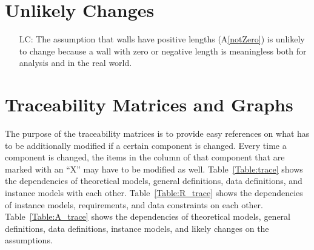 \documentclass[12pt]{article}
\newcommand{\aref}[1]{A\ref{#1}}
\newcounter{lcnum} %
\begin{document}
\section{Unlikely Changes}    

\noindent \begin{itemize}

\item[LC\refstepcounter{lcnum}\thelcnum\label{WallsHaveLength}:]  The assumption 
that walls have positive lengths (\aref{notZero}) is unlikely to change because 
a wall with zero or negative length is meaningless both for analysis and in the 
real world.

\end{itemize}

\section{Traceability Matrices and Graphs}

The purpose of the traceability matrices is to provide easy references on what
has to be additionally modified if a certain component is changed.  Every time a
component is changed, the items in the column of that component that are marked
with an ``X'' may have to be modified as well.  Table~\ref{Table:trace} shows the
dependencies of theoretical models, general definitions, data definitions, and
instance models with each other. Table~\ref{Table:R_trace} shows the
dependencies of instance models, requirements, and data constraints on each
other. Table~\ref{Table:A_trace} shows the dependencies of theoretical models,
general definitions, data definitions, instance models, and likely changes on
the assumptions.
\end{document}
